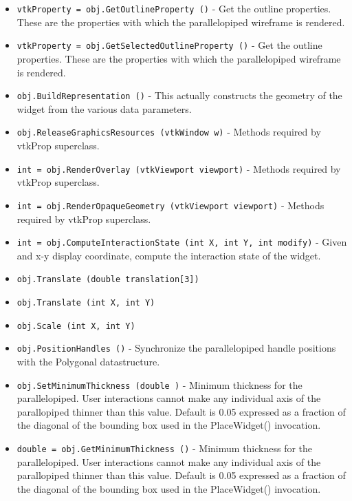 \begin{itemize}
\item  \verb|vtkProperty = obj.GetOutlineProperty ()| -  Get the outline properties. These are the properties with which the
 parallelopiped wireframe is rendered.

\item  \verb|vtkProperty = obj.GetSelectedOutlineProperty ()| -  Get the outline properties. These are the properties with which the
 parallelopiped wireframe is rendered.

\item  \verb|obj.BuildRepresentation ()| -  This actually constructs the geometry of the widget from the various
 data parameters.

\item  \verb|obj.ReleaseGraphicsResources (vtkWindow w)| -  Methods required by vtkProp superclass.

\item  \verb|int = obj.RenderOverlay (vtkViewport viewport)| -  Methods required by vtkProp superclass.

\item  \verb|int = obj.RenderOpaqueGeometry (vtkViewport viewport)| -  Methods required by vtkProp superclass.

\item  \verb|int = obj.ComputeInteractionState (int X, int Y, int modify)| -  Given and x-y display coordinate, compute the interaction state of 
 the widget.

\item  \verb|obj.Translate (double translation[3])|

\item  \verb|obj.Translate (int X, int Y)|

\item  \verb|obj.Scale (int X, int Y)|

\item  \verb|obj.PositionHandles ()| -  Synchronize the parallelopiped handle positions with the 
 Polygonal datastructure.

\item  \verb|obj.SetMinimumThickness (double )| -  Minimum thickness for the parallelopiped. User interactions cannot make
 any individual axis of the parallopiped thinner than this value.
 Default is 0.05 expressed as a fraction of the diagonal of the bounding
 box used in the PlaceWidget() invocation.

\item  \verb|double = obj.GetMinimumThickness ()| -  Minimum thickness for the parallelopiped. User interactions cannot make
 any individual axis of the parallopiped thinner than this value.
 Default is 0.05 expressed as a fraction of the diagonal of the bounding
 box used in the PlaceWidget() invocation.

\end{itemize}

